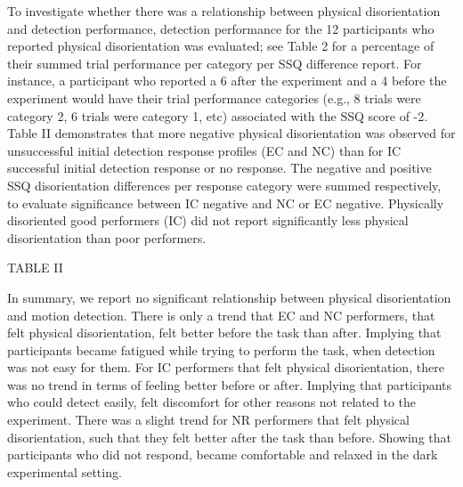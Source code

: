 \documentclass[11pt, onecolumn]{article}
\begin{document}
To investigate whether there was a relationship between physical disorientation and detection performance, detection performance for the 12 participants who reported physical disorientation was evaluated; see Table 2 for a percentage of their summed trial performance per category per SSQ difference report.  For instance, a participant who reported a 6 after the experiment and a 4 before the experiment would have their trial performance categories (e.g., 8 trials were category 2, 6 trials were category 1, etc) associated with the SSQ score of -2.  Table II demonstrates that more negative physical disorientation was observed for unsuccessful initial detection response profiles (EC and NC) than for IC successful initial detection response or no response. The negative and positive SSQ disorientation differences per response category were summed respectively, to evaluate significance between IC negative and NC or EC negative.  Physically disoriented good performers (IC) did not report significantly less physical disorientation than poor performers.

TABLE II

In summary, we report no significant relationship between physical disorientation and motion detection.  There is only a trend that EC and NC performers, that felt physical disorientation, felt better before the task than after.  Implying that participants became fatigued while trying to perform the task, when detection was not easy for them.  For IC performers that felt physical disorientation, there was no trend in terms of feeling better before or after.  Implying that participants who could detect easily, felt discomfort for other reasons not related to the experiment.  There was a slight trend for NR performers that felt physical disorientation, such that they felt better after the task than before.  Showing that participants who did not respond, became comfortable and relaxed in the dark experimental setting.
\end{document}

